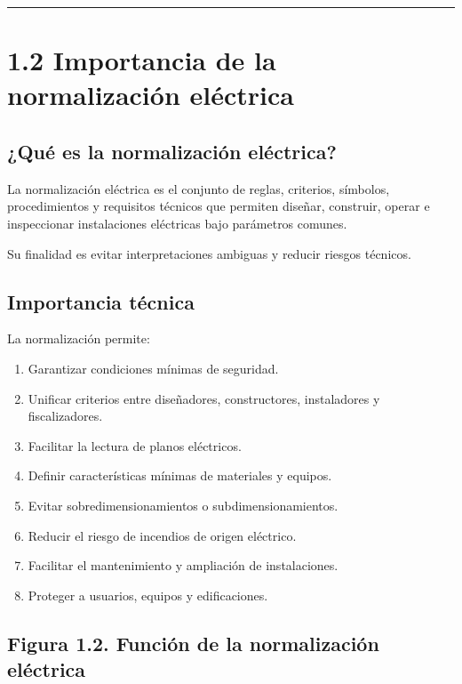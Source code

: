 \documentclass[
  spanish,
  letterpaper,
  DIV=11,
  numbers=noendperiod]{scrreprt}
\providecommand{\tightlist}{%
  \setlength{\itemsep}{0pt}\setlength{\parskip}{0pt}}
\begin{document}
\begin{center}\rule{0.5\linewidth}{0.5pt}\end{center}

\section{1.2 Importancia de la normalización
eléctrica}\label{importancia-de-la-normalizaciuxf3n-eluxe9ctrica}

\subsection{¿Qué es la normalización
eléctrica?}\label{quuxe9-es-la-normalizaciuxf3n-eluxe9ctrica}

La normalización eléctrica es el conjunto de reglas, criterios,
símbolos, procedimientos y requisitos técnicos que permiten diseñar,
construir, operar e inspeccionar instalaciones eléctricas bajo
parámetros comunes.

Su finalidad es evitar interpretaciones ambiguas y reducir riesgos
técnicos.

\subsection{Importancia técnica}\label{importancia-tuxe9cnica}

La normalización permite:

\begin{enumerate}
\def\labelenumi{\arabic{enumi}.}
\tightlist
\item
  Garantizar condiciones mínimas de seguridad.
\item
  Unificar criterios entre diseñadores, constructores, instaladores y
  fiscalizadores.
\item
  Facilitar la lectura de planos eléctricos.
\item
  Definir características mínimas de materiales y equipos.
\item
  Evitar sobredimensionamientos o subdimensionamientos.
\item
  Reducir el riesgo de incendios de origen eléctrico.
\item
  Facilitar el mantenimiento y ampliación de instalaciones.
\item
  Proteger a usuarios, equipos y edificaciones.
\end{enumerate}

\subsection{Figura 1.2. Función de la normalización
eléctrica}\label{figura-1.2.-funciuxf3n-de-la-normalizaciuxf3n-eluxe9ctrica}
\end{document}
